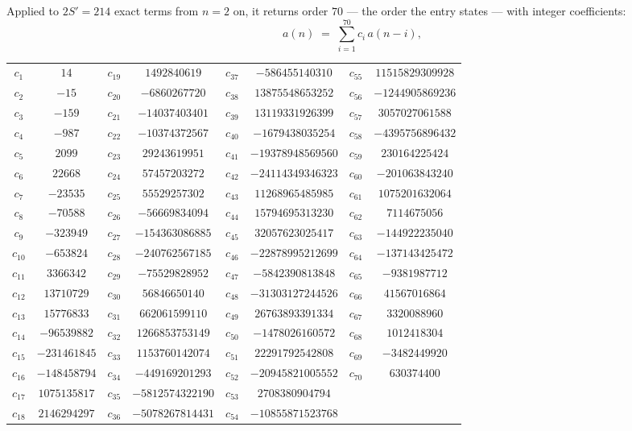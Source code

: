 \documentclass[11pt,a4paper]{article}
\theoremstyle{plain}
\theoremstyle{definition}
\begin{document}
Applied to $2S'=214$ exact terms from $n=2$ on, it returns order $70$ --- the
order the entry states --- with integer coefficients:
\[
a(n)\;=\;\sum_{i=1}^{70}c_i\,a(n-i),
\]
\begin{center}\small
\begin{tabular}{cccccccc}
$c_{1}$ & $14$ & $c_{19}$ & $1492840619$ & $c_{37}$ & $-586455140310$ & $c_{55}$ & $11515829309928$ \\
$c_{2}$ & $-15$ & $c_{20}$ & $-6860267720$ & $c_{38}$ & $13875548653252$ & $c_{56}$ & $-1244905869236$ \\
$c_{3}$ & $-159$ & $c_{21}$ & $-14037403401$ & $c_{39}$ & $13119331926399$ & $c_{57}$ & $3057027061588$ \\
$c_{4}$ & $-987$ & $c_{22}$ & $-10374372567$ & $c_{40}$ & $-1679438035254$ & $c_{58}$ & $-4395756896432$ \\
$c_{5}$ & $2099$ & $c_{23}$ & $29243619951$ & $c_{41}$ & $-19378948569560$ & $c_{59}$ & $230164225424$ \\
$c_{6}$ & $22668$ & $c_{24}$ & $57457203272$ & $c_{42}$ & $-24114349346323$ & $c_{60}$ & $-201063843240$ \\
$c_{7}$ & $-23535$ & $c_{25}$ & $55529257302$ & $c_{43}$ & $11268965485985$ & $c_{61}$ & $1075201632064$ \\
$c_{8}$ & $-70588$ & $c_{26}$ & $-56669834094$ & $c_{44}$ & $15794695313230$ & $c_{62}$ & $7114675056$ \\
$c_{9}$ & $-323949$ & $c_{27}$ & $-154363086885$ & $c_{45}$ & $32057623025417$ & $c_{63}$ & $-144922235040$ \\
$c_{10}$ & $-653824$ & $c_{28}$ & $-240762567185$ & $c_{46}$ & $-22878995212699$ & $c_{64}$ & $-137143425472$ \\
$c_{11}$ & $3366342$ & $c_{29}$ & $-75529828952$ & $c_{47}$ & $-5842390813848$ & $c_{65}$ & $-9381987712$ \\
$c_{12}$ & $13710729$ & $c_{30}$ & $56846650140$ & $c_{48}$ & $-31303127244526$ & $c_{66}$ & $41567016864$ \\
$c_{13}$ & $15776833$ & $c_{31}$ & $662061599110$ & $c_{49}$ & $26763893391334$ & $c_{67}$ & $3320088960$ \\
$c_{14}$ & $-96539882$ & $c_{32}$ & $1266853753149$ & $c_{50}$ & $-1478026160572$ & $c_{68}$ & $1012418304$ \\
$c_{15}$ & $-231461845$ & $c_{33}$ & $1153760142074$ & $c_{51}$ & $22291792542808$ & $c_{69}$ & $-3482449920$ \\
$c_{16}$ & $-148458794$ & $c_{34}$ & $-449169201293$ & $c_{52}$ & $-20945821005552$ & $c_{70}$ & $630374400$ \\
$c_{17}$ & $1075135817$ & $c_{35}$ & $-5812574322190$ & $c_{53}$ & $2708380904794$ &  &  \\
$c_{18}$ & $2146294297$ & $c_{36}$ & $-5078267814431$ & $c_{54}$ & $-10855871523768$ &  &  \\
\end{tabular}
\end{center}
\end{document}
